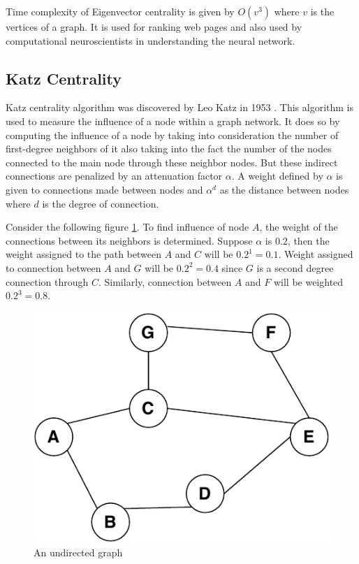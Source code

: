 \documentclass[journal,twoside,web]{ieeecolor}
\begin{document}
Time complexity of Eigenvector centrality is given by $O(v^3)$ where $v$ is the vertices of a graph. It is used for ranking web pages and also used by computational neuroscientists in understanding the neural network.

\subsection{Katz Centrality}
Katz centrality algorithm was discovered by Leo Katz in 1953 \cite{58}. This algorithm is used to measure the influence of a node within a graph network. It does so by computing the influence of a node by taking into consideration the number of first-degree neighbors of it also taking into the fact the number of the nodes connected to the main node through these neighbor nodes. But these indirect connections are penalized by an attenuation factor $\alpha$. A weight defined by $\alpha$ is given to connections made between nodes and $\alpha$$^d$  as the distance between nodes where $d$ is the degree of connection.

Consider the following figure \ref{fig12}. To find influence of node $A$, the weight of the connections between its neighbors is determined. Suppose $\alpha$ is $0.2$, then the weight assigned to the path between $A$ and $C$ will be $0.2^1 = 0.1$. Weight assigned to connection between $A$ and $G$ will be $0.2^2 = 0.4$ since $G$ is a second degree connection through $C$. Similarly, connection between $A$ and $F$ will be weighted $0.2^3 = 0.8$.

\begin{figure}[!h]
    \centerline{\includegraphics[scale=0.6]{figures/katz.pdf}}
    \caption{An undirected graph}
    \label{fig12}
\end{figure}
\end{document}
